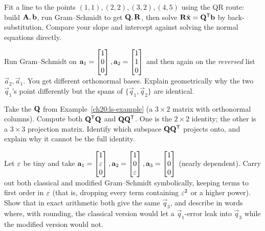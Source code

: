 \begin{exercise}
Fit a line to the points $(1,1),(2,2),(3,2),(4,5)$ using the QR route: build
$\mathbf{A},\mathbf{b}$, run Gram--Schmidt to get $\mathbf{Q},\mathbf{R}$, then solve
$\mathbf{R}\hat{\mathbf{x}}=\mathbf{Q}^{\mathsf{T}}\mathbf{b}$ by back-substitution. Compare your slope and
intercept against solving the normal equations directly.
\end{exercise}

\begin{exercise}
Run Gram--Schmidt on $\mathbf{a}_1=\begin{bmatrix}1\\0\\0\end{bmatrix},\mathbf{a}_2=\begin{bmatrix}1\\1\\0\end{bmatrix}$ and then
again on the \emph{reversed} list $\vec{a}_2,\vec{a}_1$. You get different orthonormal
bases. Explain geometrically why the two $\vec{q}_1$'s point differently but the spans
of $\{\vec{q}_1,\vec{q}_2\}$ are identical.
\end{exercise}

\begin{exercise}[Why $\mat{Q}\T\mat{Q}=\mat{I}$ but $\mat{Q}\mat{Q}\T\neq\mat{I}$]
Take the $\mathbf{Q}$ from Example~\ref{ch20:ls-example} (a $3\times 2$ matrix with
orthonormal columns). Compute both $\mathbf{Q}^{\mathsf{T}}\mathbf{Q}$ and $\mathbf{Q}\mathbf{Q}^{\mathsf{T}}$. One is
the $2\times 2$ identity; the other is a $3\times 3$ projection matrix. Identify which
subspace $\mathbf{Q}\mathbf{Q}^{\mathsf{T}}$ projects onto, and explain why it cannot be the full
identity.
\end{exercise}

\begin{exercise}
Let $\varepsilon$ be tiny and take
$\mathbf{a}_1=\begin{bmatrix}1\\\varepsilon\\0\end{bmatrix},\mathbf{a}_2=\begin{bmatrix}1\\0\\\varepsilon\end{bmatrix},\mathbf{a}_3=\begin{bmatrix}1\\0\\0\end{bmatrix}$
(nearly dependent). Carry out both classical and modified Gram--Schmidt symbolically,
keeping terms to first order in $\varepsilon$ (that is, dropping every term containing $\varepsilon^2$ or a
higher power). Show that in exact arithmetic both give the same
$\vec{q}_3$, and describe in words where, with rounding, the classical version would let
a $\vec{q}_1$-error leak into $\vec{q}_3$ while the modified version would not.
\end{exercise}

